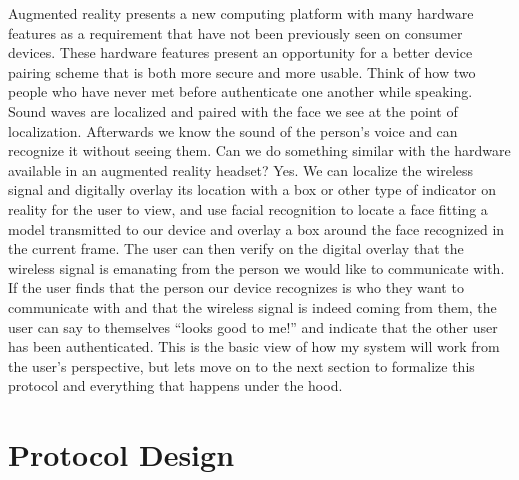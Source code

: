\documentclass[12pt,dvips]{report}
\begin{document}
Augmented reality presents a new computing platform with many hardware features as a requirement that have not been previously seen on consumer devices. These hardware features present an opportunity for a better device pairing scheme that is both more secure and more usable. Think of how two people who have never met before authenticate one another while speaking. Sound waves are localized and paired with the face we see at the point of localization. Afterwards we know the sound of the person's voice and can recognize it without seeing them. Can we do something similar with the hardware available in an augmented reality headset? Yes. We can localize the wireless signal and digitally overlay its location with a box or other type of indicator on reality for the user to view, and use facial recognition to locate a face fitting a model transmitted to our device and overlay a box around the face recognized in the current frame. The user can then verify on the digital overlay that the wireless signal is emanating from the person we would like to communicate with. If the user finds that the person our device recognizes is who they want to communicate with and that the wireless signal is indeed coming from them, the user can say to themselves ``looks good to me!'' and indicate that the other user has been authenticated. This is the basic view of how my system will work from the user's perspective, but lets move on to the next section to formalize this protocol and everything that happens under the hood.


\chapter{Protocol Design}
\end{document}
